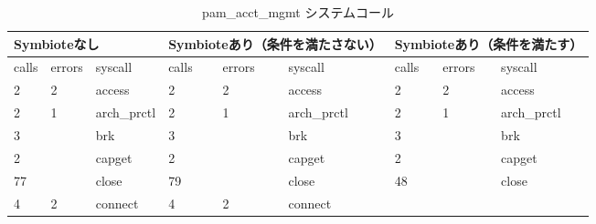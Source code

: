 \documentclass[submit,techreq,noauthor]{eco}	%
\begin{document}
\begin{table}[t]
  \centering
  \caption{pam\_acct\_mgmt システムコール}
  \label{table: pam}
  \begin{tabular}{|lllllllll|}
  \hline
  \multicolumn{3}{|l|}{Symbioteなし}                                                                   & \multicolumn{3}{l|}{Symbioteあり（条件を満たさない）}                                                         & \multicolumn{3}{l|}{Symbioteあり（条件を満たす）}                                      \\ \hline
  \multicolumn{1}{|l|}{calls} & \multicolumn{1}{l|}{errors} & \multicolumn{1}{l|}{syscall}           & \multicolumn{1}{l|}{calls} & \multicolumn{1}{l|}{errors} & \multicolumn{1}{l|}{syscall}           & \multicolumn{1}{l|}{calls} & \multicolumn{1}{l|}{errors} & syscall           \\ \hline
  \multicolumn{1}{|l|}{2}     & \multicolumn{1}{l|}{2}      & \multicolumn{1}{l|}{access}            & \multicolumn{1}{l|}{2}     & \multicolumn{1}{l|}{2}      & \multicolumn{1}{l|}{access}            & \multicolumn{1}{l|}{2}     & \multicolumn{1}{l|}{2}      & access            \\
  \multicolumn{1}{|l|}{2}     & \multicolumn{1}{l|}{1}      & \multicolumn{1}{l|}{arch\_prctl}       & \multicolumn{1}{l|}{2}     & \multicolumn{1}{l|}{1}      & \multicolumn{1}{l|}{arch\_prctl}       & \multicolumn{1}{l|}{2}     & \multicolumn{1}{l|}{1}      & arch\_prctl       \\
  \multicolumn{1}{|l|}{3}     & \multicolumn{1}{l|}{}       & \multicolumn{1}{l|}{brk}               & \multicolumn{1}{l|}{3}     & \multicolumn{1}{l|}{}       & \multicolumn{1}{l|}{brk}               & \multicolumn{1}{l|}{3}     & \multicolumn{1}{l|}{}       & brk               \\
  \multicolumn{1}{|l|}{2}     & \multicolumn{1}{l|}{}       & \multicolumn{1}{l|}{capget}            & \multicolumn{1}{l|}{2}     & \multicolumn{1}{l|}{}       & \multicolumn{1}{l|}{capget}            & \multicolumn{1}{l|}{2}     & \multicolumn{1}{l|}{}       & capget            \\
  \multicolumn{1}{|l|}{77}    & \multicolumn{1}{l|}{}       & \multicolumn{1}{l|}{close}             & \multicolumn{1}{l|}{79}    & \multicolumn{1}{l|}{}       & \multicolumn{1}{l|}{close}             & \multicolumn{1}{l|}{48}    & \multicolumn{1}{l|}{}       & close             \\
  \multicolumn{1}{|l|}{4}     & \multicolumn{1}{l|}{2}      & \multicolumn{1}{l|}{connect}           & \multicolumn{1}{l|}{4}     & \multicolumn{1}{l|}{2}      & \multicolumn{1}{l|}{connect}           & \multicolumn{1}{l|}{}      & \multicolumn{1}{l|}{}       &                   \\

\end{tabular}
\end{table}
\end{document}
